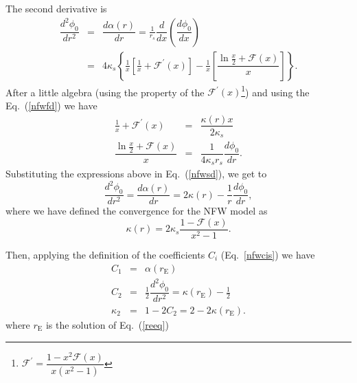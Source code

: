 \documentclass[a4paper,twoside]{article}
\def \ks {\kappa_s}
\def \rs {r_s}
\def \mf {\mathcal{F}}
\def \re {r_{\mathrm{E}}}
\def \po {\phi_0}
\def \al {\alpha}
\begin{document}
The second derivative is
\begin{eqnarray}
\dfrac{d^2\po}{dr^2}&=&\dfrac{d\al(r)}{dr}=\frac{1}{\rs}\dfrac{d}{dx}\left(\dfrac{d\po}{dx} \right) \nonumber \\
                    &=& 4\ks\left\{\frac{1}{x}\left[\frac{1}{x}+\mf^\prime(x)\right]%
                    -\frac{1}{x}\left[\dfrac{\ln\frac{x}{2}+\mf(x)}{x}\right]\right\}.
\label{nfwsd}
\end{eqnarray}
After a little algebra (using the property of the $\mf^\prime(x)$\footnote{$\mf^\prime=\dfrac{1-x^2\mf(x)}{x(x^2-1)} $}) and using the
Eq.~(\ref{nfwfd}) we have
\begin{eqnarray*}
\frac{1}{x}+\mf^\prime(x)&=& \dfrac{\kappa(r)x}{2\ks}\\
\dfrac{\ln\frac{x}{2}+\mf(x)}{x}&=&\dfrac{1}{4\ks\rs}\dfrac{d\po}{dr}.
\end{eqnarray*}
Substituting the expressions above in  Eq.~(\ref{nfwsd}), we get to 
\begin{equation}
\dfrac{d^2\po}{dr^2}=\dfrac{d\al(r)}{dr}=2\kappa(r)-\frac{1}{r}\dfrac{d\po}{dr},
\label{nfwsdb}
\end{equation}
where we have defined the convergence for the NFW model as
\begin{equation}
\kappa(r)=2\ks\dfrac{1-\mf(x)}{x^2-1}.
\label{nfwk}
\end{equation}

Then, applying the definition of the coefficients $C_i$ (Eq.~\ref{nfwcis}) we have
\begin{eqnarray}
C_1&=&\al(\re) \label{nfwc1} \\
C_2&=&\frac{1}{2}\dfrac{d^2\po}{dr^2}=\kappa(\re)-\frac{1}{2} \label{nfwc2} \\
\kappa_2&=& 1-2C_2=2-2\kappa(\re) \label{nfwk2}.
\end{eqnarray}
where $\re$ is the solution of Eq.~(\ref{reeq})
\end{document}
